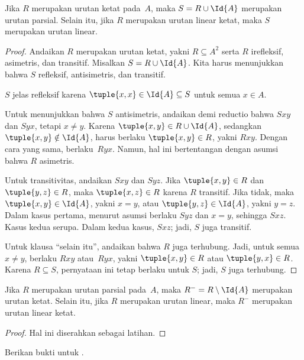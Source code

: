 \documentclass[../../../include/open-logic-section]{subfiles}
\begin{document}
\begin{prop}
Jika $R$ merupakan urutan ketat pada~$A$, maka $S = R \cup \Id{A}$ merupakan
urutan parsial. Selain itu, jika $R$ merupakan urutan linear ketat, maka $S$
merupakan urutan linear.
\end{prop}

\begin{proof}
Andaikan $R$ merupakan urutan ketat, yakni $R \subseteq A^2$ serta $R$
irefleksif, asimetris, dan transitif. Misalkan $S = R \cup \Id{A}$. Kita
harus menunjukkan bahwa $S$ refleksif, antisimetris, dan transitif.

$S$ jelas refleksif karena $\tuple{x, x} \in \Id{A} \subseteq S$ untuk
semua $x \in A$.

Untuk menunjukkan bahwa $S$ antisimetris, andaikan demi reductio bahwa
$Sxy$ dan $Syx$, tetapi $x \neq y$. Karena
$\tuple{x,y} \in R \cup \Id{A}$, sedangkan
$\tuple{x, y} \notin \Id{A}$, harus berlaku $\tuple{x, y} \in R$, yakni
$Rxy$. Dengan cara yang sama, berlaku~$Ryx$. Namun, hal ini bertentangan
dengan asumsi bahwa $R$ asimetris.

Untuk transitivitas, andaikan $Sxy$ dan $Syz$. Jika
$\tuple{x, y} \in R$ dan $\tuple{y,z} \in R$, maka
$\tuple{x, z} \in R$ karena $R$ transitif. Jika tidak, maka
$\tuple{x, y} \in \Id{A}$, yakni $x = y$, atau
$\tuple{y, z} \in \Id{A}$, yakni $y = z$. Dalam kasus pertama, menurut asumsi
berlaku $Syz$ dan $x = y$, sehingga $Sxz$. Kasus kedua serupa. Dalam kedua
kasus, $Sxz$; jadi, $S$ juga transitif.

Untuk klausa ``selain itu'', andaikan bahwa $R$ juga terhubung. Jadi, untuk
semua $x \neq y$, berlaku $Rxy$ atau~$Ryx$, yakni
$\tuple{x, y} \in R$ atau $\tuple{y, x} \in R$. Karena $R \subseteq S$,
pernyataan ini tetap berlaku untuk $S$; jadi, $S$ juga terhubung.
\end{proof}

\begin{prop}
Jika $R$ merupakan urutan parsial pada~$A$, maka
$R^- = R \setminus \Id{A}$ merupakan urutan ketat. Selain itu, jika $R$
merupakan urutan linear, maka $R^-$ merupakan urutan linear ketat.
\end{prop}

\begin{proof}
Hal ini diserahkan sebagai latihan.
\end{proof}

\begin{prob}
Berikan bukti untuk .
\end{prob}
\end{document}
